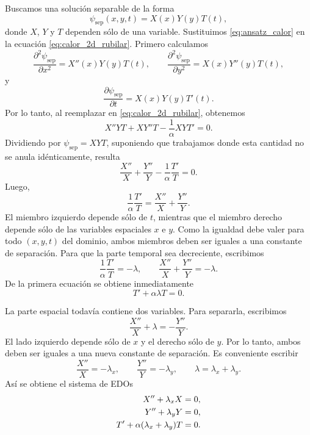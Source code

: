 \documentclass[11pt]{article}
\begin{document}
Buscamos una solución separable de la forma
\begin{equation}
\psi_{\mathrm{sep}}(x,y,t)=X(x)Y(y)T(t),
    \label{eq:ansatz_calor}
\end{equation}
donde $X$, $Y$ y $T$ dependen sólo de una variable. Sustituimos \eqref{eq:ansatz_calor} en la ecuación \eqref{eq:calor_2d_rubilar}. Primero calculamos
\begin{equation*}
\frac{\partial^2\psi_{\mathrm{sep}}}{\partial x^2}=X''(x)Y(y)T(t),
    \qquad
    \frac{\partial^2\psi_{\mathrm{sep}}}{\partial y^2}=X(x)Y''(y)T(t),
\end{equation*}
y
\begin{equation*}
\frac{\partial\psi_{\mathrm{sep}}}{\partial t}=X(x)Y(y)T'(t).
\end{equation*}
Por lo tanto, al reemplazar en \eqref{eq:calor_2d_rubilar}, obtenemos
\begin{equation*}
X''YT+XY''T-\frac{1}{\alpha}XYT'=0.
\end{equation*}
Dividiendo por $\psi_{\mathrm{sep}}=XYT$, suponiendo que trabajamos donde esta cantidad no se anula idénticamente, resulta
\begin{equation*}
\frac{X''}{X}+\frac{Y''}{Y}-\frac{1}{\alpha}\frac{T'}{T}=0.
\end{equation*}
Luego,
\begin{equation*}
\frac{1}{\alpha}\frac{T'}{T}
    =
    \frac{X''}{X}+\frac{Y''}{Y}.
\end{equation*}
El miembro izquierdo depende sólo de $t$, mientras que el miembro derecho depende sólo de las variables espaciales $x$ e $y$. Como la igualdad debe valer para todo $(x,y,t)$ del dominio, ambos miembros deben ser iguales a una constante de separación. Para que la parte temporal sea decreciente, escribimos
\begin{equation*}
\frac{1}{\alpha}\frac{T'}{T}=-\lambda,
    \qquad
    \frac{X''}{X}+\frac{Y''}{Y}=-\lambda.
\end{equation*}
De la primera ecuación se obtiene inmediatamente
\begin{equation*}
T'+\alpha\lambda T=0.
\end{equation*}

La parte espacial todavía contiene dos variables. Para separarla, escribimos
\begin{equation*}
\frac{X''}{X}+\lambda=-\frac{Y''}{Y}.
\end{equation*}
El lado izquierdo depende sólo de $x$ y el derecho sólo de $y$. Por lo tanto, ambos deben ser iguales a una nueva constante de separación. Es conveniente escribir
\begin{equation*}
\frac{X''}{X}=-\lambda_x,
    \qquad
    \frac{Y''}{Y}=-\lambda_y,
    \qquad
    \lambda=\lambda_x+\lambda_y.
\end{equation*}
Así se obtiene el sistema de EDOs
\begin{align}
X''+\lambda_x X&=0,
    \notag\\
    Y''+\lambda_y Y&=0,
    \notag\\
    T'+\alpha(\lambda_x+\lambda_y)T&=0.\label{eq:edo_t_calor}
\end{align}
\end{document}
